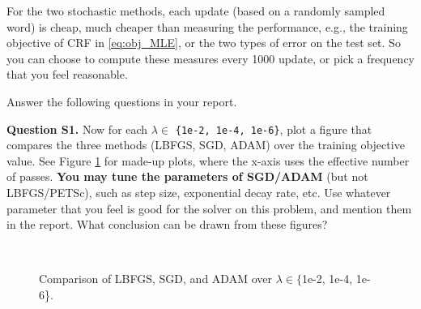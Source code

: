 \documentclass[11pt]{report}
\begin{document}
For the two stochastic methods, each update (based on a randomly sampled word) is cheap, 
much cheaper than measuring the performance,
e.g., the training objective of CRF in \eqref{eq:obj_MLE}, or the two types of error on the test set.
So you can choose to compute these measures every 1000 update, 
or pick a frequency that you feel reasonable.



Answer the following questions in your report.

{\bf Question S1.}
%
Now for each $\lambda \in$ \verb!{1e-2, 1e-4, 1e-6}!,
plot a figure that compares the three methods (LBFGS, SGD, ADAM) over the training objective value.
See Figure \ref{fig:compare_sgd} for made-up plots,
where the x-axis uses the effective number of passes.
{\bf You may tune the parameters of SGD/ADAM} (but not LBFGS/PETSc),
such as step size, exponential decay rate, etc.
Use whatever parameter that you feel is good for the solver on this problem,
and mention them in the report.
What conclusion can be drawn from these figures?



\begin{figure}[t]
\centering
{}
~~
~~
\caption{Comparison of LBFGS, SGD, and ADAM over $\lambda \in \{${\sf 1e-2, 1e-4, 1e-6}\}.}
\label{fig:compare_sgd}
\end{figure}
\end{document}
